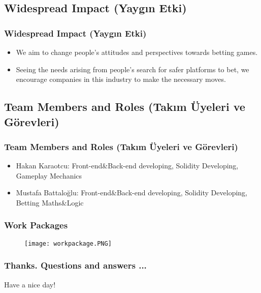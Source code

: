 \documentclass{beamer}
\begin{document}
\subsection {Widespread Impact (Yaygın Etki)} 

\begin{frame}
\frametitle{Widespread Impact (Yaygın Etki)}
\begin{itemize}
\item We aim to change people's attitudes and perspectives towards betting games.
\item Seeing the needs arising from people's search for safer platforms to bet, we encourage companies in this industry to make the necessary moves.
\end{itemize}
\end{frame}


\subsection {Team Members and Roles (Takım Üyeleri ve Görevleri)} 
\begin{frame}
\frametitle{Team Members and Roles (Takım Üyeleri ve Görevleri)}

\begin{itemize}
\item Hakan Karaotcu: Front-end&Back-end developing, Solidity  Developing, Gameplay Mechanics
\item Mustafa Battaloğlu: Front-end&Back-end developing, Solidity Developing, Betting Maths\&Logic
\end{itemize}

\end{frame}


\begin{frame}
\frametitle{Work Packages}
\begin{figure}[h!]
\begin{center}
\texttt{[image: workpackage.PNG]}
\label{fig0}
\end{center}\vs{}
\end{figure}

\end{frame}
\begin{frame}
\frametitle{Thanks. Questions and answers ...}

Have a nice day!

\end{frame}


\end{document}
